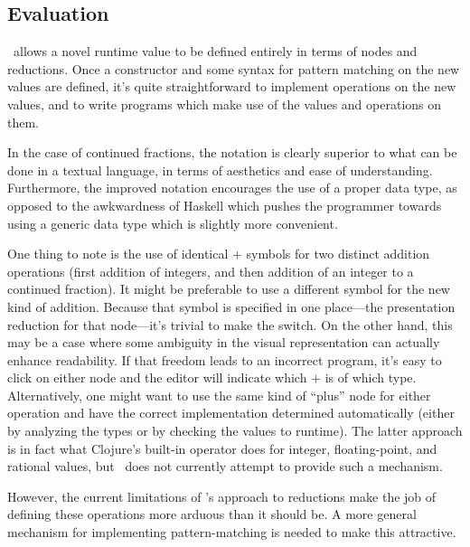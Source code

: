 \subsection{Evaluation}
\Meta\ allows a novel runtime value to be defined entirely in terms of nodes and reductions. Once a constructor and some syntax for pattern matching on the new values are defined, it's quite straightforward to implement operations on the new values, and to write programs which make use of the values and operations on them.

In the case of continued fractions, the notation is clearly superior to what can be done in a textual language, in terms of aesthetics and ease of understanding. Furthermore, the improved notation encourages the use of a proper data type, as opposed to the awkwardness of Haskell which pushes the programmer towards using a generic data type which is slightly more convenient.

One thing to note is the use of identical $+$ symbols for two distinct addition operations (first addition of integers, and then addition of an integer to a continued fraction). It might be preferable to use a different symbol for the new kind of addition. Because that symbol is specified in one place---the presentation reduction for that node---it's trivial to make the switch. On the other hand, this may be a case where some ambiguity in the visual representation can actually enhance readability. If that freedom leads to an incorrect program, it's easy to click on either node and the editor will indicate which $+$ is of which type. Alternatively, one might want to use the same kind of ``plus'' node for either operation and have the correct implementation determined automatically (either by analyzing the types or by checking the values to runtime). The latter approach is in fact what Clojure's built-in \clojure{+} operator does for integer, floating-point, and rational values, but \Meta\ does not currently attempt to provide such a mechanism.

However, the current limitations of \Meta's approach to reductions make the job of defining these operations more arduous than it should be. A more general mechanism for implementing pattern-matching is needed to make this attractive.

